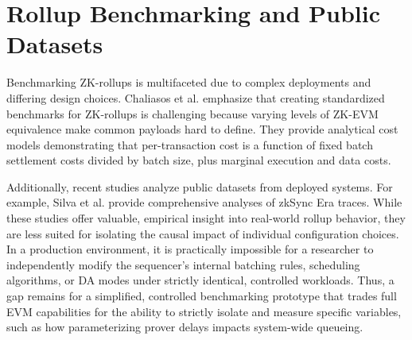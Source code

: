 \section{Rollup Benchmarking and Public Datasets}
\label{sec:rollup_benchmarking}

Benchmarking ZK-rollups is multifaceted due to complex deployments and differing design choices. Chaliasos et al. \citet{chaliasos2024analyzing} emphasize that creating standardized benchmarks for ZK-rollups is challenging because varying levels of ZK-EVM equivalence make common payloads hard to define. They provide analytical cost models demonstrating that per-transaction cost is a function of fixed batch settlement costs divided by batch size, plus marginal execution and data costs.

Additionally, recent studies analyze public datasets from deployed systems. For example, Silva et al. \citet{silva2025zksyncdataset} provide comprehensive analyses of zkSync Era traces. While these studies offer valuable, empirical insight into real-world rollup behavior, they are less suited for isolating the causal impact of individual configuration choices. In a production environment, it is practically impossible for a researcher to independently modify the sequencer's internal batching rules, scheduling algorithms, or DA modes under strictly identical, controlled workloads. Thus, a gap remains for a simplified, controlled benchmarking prototype that trades full EVM capabilities for the ability to strictly isolate and measure specific variables, such as how parameterizing prover delays impacts system-wide queueing.
